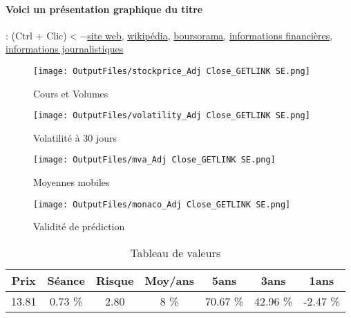 \documentclass[11pt,a4paper]{report}%
\begin{document}
\paragraph{Voici un présentation graphique du titre} : (Ctrl + Clic)$<-$\href{https://www.getlinkgroup.com/}{site web}, \href{https://fr.wikipedia.org/wiki/Getlink}{wikipédia}, \href{https://www.boursorama.com/cours/1rPGET}{boursorama}, \href{https://www.qwant.com/?q=site:https:%2f%2fwww.easybourse.com%2faction-societe%2fGETLINK-SE&t=web&client=ext-firefox-hp}{informations financières}, \href{https://bourse.lerevenu.com/cours-de-bourse/fiche-valeur-synthese/GETLINK-SE/GET-FR}{informations journalistiques}
\begin{figure}[!htb]
   \begin{minipage}{0.5\textwidth}
     \centering
     \texttt{[image: OutputFiles/stockprice\_Adj Close\_GETLINK SE.png]}
     \caption{Cours et Volumes}\label{Fig:price_GETLINK SE}
   \end{minipage}\hfill
   \begin{minipage}{0.5\textwidth}
     \centering
     \texttt{[image: OutputFiles/volatility\_Adj Close\_GETLINK SE.png]}
     \caption{Volatilité à 30 jours}\label{Fig:volat_GETLINK SE}
   \end{minipage}
\end{figure}
\begin{figure}[!htb]
   \begin{minipage}{0.5\textwidth}
     \centering
     \texttt{[image: OutputFiles/mva\_Adj Close\_GETLINK SE.png]}
     \caption{Moyennes mobiles}\label{Fig:mva_GETLINK SE}
   \end{minipage}\hfill
   \begin{minipage}{0.5\textwidth}
     \centering
     \texttt{[image: OutputFiles/monaco\_Adj Close\_GETLINK SE.png]}
     \caption{Validité de prédiction}\label{Fig:prediction_GETLINK SE}
   \end{minipage}
\end{figure}

\begin{table}[H]
  \centering
    \begin{tabular}{|c|c|c|c|c|c|c|}
    \hline
    Prix & Séance & Risque  & Moy/ans & 5ans & 3ans & 1ans \\
    \hline
    13.81 &    0.73 \%    & 2.80 & 8 \% & 70.67 \% & 42.96 \% & -2.47 \% \\
    \hline
    \end{tabular}%
        \label{tab:table_GETLINK SE}%
      \caption{Tableau de valeurs}
\end{table}%
\end{document}
